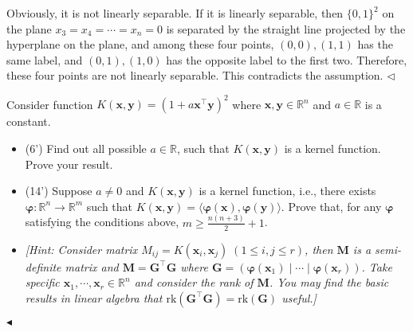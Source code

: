 \documentclass[11pt]{article}
\newenvironment{problem}[2][Problem]{\begin{trivlist}
\item[\hskip \labelsep {\bfseries #1}\hskip \labelsep {\bfseries #2.}]}{\hfill$\blacktriangleleft$\end{trivlist}}
\newenvironment{answer}[1][Answer]{\begin{trivlist}
\item[\hskip \labelsep {\bfseries #1.}\hskip \labelsep]}{\hfill$\lhd$\end{trivlist}}
\begin{document}
\begin{answer}
    Obviously, it is not linearly separable. If it is linearly separable, then $\{0,1\}^2$ on the plane $x_3=x_4=\cdots=x_n=0$ is separated by the straight line projected by the hyperplane on the plane, and among these four points, $(0, 0),(1,1)$ has the same label, and $(0,1),(1,0)$ has the opposite label to the first two. Therefore, these four points are not linearly separable. This contradicts the assumption.
\end{answer}

\begin{problem}{7 (20')} Consider function $K(\bm x,\bm y)=(1+a\bm x^\top \bm y)^2$ where $\bm x,\bm y\in\mathbb{R}^n$ and $a\in\mathbb{R}$ is a constant.  
\begin{itemize}
    \item [(1)] (6') Find out all possible $a\in\mathbb{R}$, such that $K(\bm x,\bm y)$ is a kernel function. Prove your result.
    \item [(2)] (14') Suppose $a\ne 0$ and $K(\bm x,\bm y)$ is a kernel function, i.e., there exists $\bm \varphi:\mathbb{R}^n\to\mathbb{R}^m$ such that $K(\bm x,\bm y)=\langle \bm \varphi(\bm x),\bm \varphi(\bm y)\rangle$. Prove that, for any $\bm \varphi$ satisfying the conditions above, $m\geq \frac{n(n+3)}{2}+1$.
    \item [] \textit{[Hint: Consider matrix $M_{ij}=K(\bm x_i,\bm x_j)\;(1\leq i,j\leq r)$, then $\bm M$ is a semi-definite matrix and $\bm M=\bm G^\top \bm G$ where $\bm G=(\bm \varphi(\bm x_1)\mid\cdots\mid\bm \varphi(\bm x_r))$. Take specific $\bm x_1,\cdots,\bm x_r\in\mathbb{R}^n$ and consider the rank of $\bm M$. You may find the basic results in linear algebra that $\mathrm{rk}(\bm G^\top \bm G)=\mathrm{rk}(\bm G)$ useful.]}
\end{itemize}
\end{problem}
\end{document}

